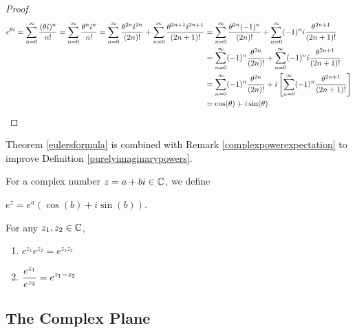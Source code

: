 \documentclass[11pt,fleqn,dvipsnames,usenames]{article}
\newcommand{\p}{\noindent}
\begin{document}
\begin{proof}
\begin{align*}
e^{\theta i} = \displaystyle\sum\limits_{n=0}^{\infty}\frac{(\theta i)^{n}}{n!} = \displaystyle\sum\limits_{n=0}^{\infty}\frac{\theta^{n}i^{n}}{n!} = \displaystyle\sum\limits_{n=0}^{\infty}\frac{\theta^{2n}i^{2n}}{(2n)!} + \displaystyle\sum\limits_{n=0}^{\infty}\frac{\theta^{2n+1}i^{2n+1}}{(2n+1)!} &= \displaystyle\sum\limits_{n=0}^{\infty}\frac{\theta^{2n}(-1)^n}{(2n)!} + \displaystyle\sum\limits_{n=0}^{\infty}(-1)^{n}i\frac{\theta^{2n+1}}{(2n+1)!}\\
&= \displaystyle\sum\limits_{n=0}^{\infty}(-1)^{n}\frac{\theta^{2n}}{(2n)!} + \displaystyle\sum\limits_{n=0}^{\infty}(-1)^{n}i\frac{\theta^{2n+1}}{(2n+1)!}\\
&= \displaystyle\sum\limits_{n=0}^{\infty}(-1)^{n}\frac{\theta^{2n}}{(2n)!} + i\left[\displaystyle\sum\limits_{n=0}^{\infty}(-1)^{n}\frac{\theta^{2n+1}}{(2n+1)!}\right]\\
&= \cos(\theta) + i\sin(\theta) \tag*{\qedhere}
\end{align*}
\end{proof}
\vsp

\p Theorem \ref{eulersformula} is combined with Remark \ref{complexpowerexpectation} to improve Definition \ref{purelyimaginarypowers}.
\vsp

\begin{definition}
For a complex number $z = a+bi\in\mathbb{C}$, we define
\begin{center}
$e^{z} = e^{a}(\cos(b) + i\sin(b))$.
\end{center}
\end{definition}

\examples
\vsp

\properties For any $z_{1},z_{2}\in\mathbb{C}$,
\begin{enumerate}[(1)]
\item $e^{z_{1}}e^{z_{2}} = e^{z_{1}z_{2}}$
\item $\displaystyle{\frac{e^{z_{1}}}{e^{z_{2}}} = e^{z_{1} - z_{2}}}$
\end{enumerate}

\subsection{The Complex Plane}
\end{document}
